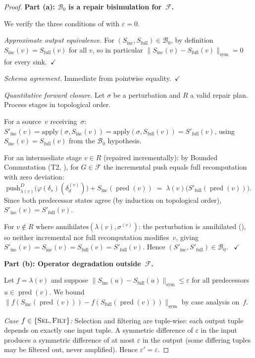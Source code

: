\documentclass[11pt,a4paper]{article}
\theoremstyle{definition}
\newcommand{\push}{\mathrm{push}}
\newcommand{\ann}{\mathrm{annihilates}}
\newcommand{\FragF}{\mathcal{F}}
\DeclareMathOperator{\pred}{pred}
\begin{document}
\begin{proof}
\textbf{Part (a): $\mathcal{B}_0$ is a repair bisimulation for~$\FragF$.}

We verify the three conditions of  with
$\varepsilon = 0$.

\emph{Approximate output equivalence.}
For $(S_{\mathrm{inc}}, S_{\mathrm{full}}) \in \mathcal{B}_0$, by definition
$S_{\mathrm{inc}}(v) = S_{\mathrm{full}}(v)$ for all $v$, so in particular
$\|S_{\mathrm{inc}}(v) - S_{\mathrm{full}}(v)\|_{\mathrm{sym}} = 0$
for every sink.~$\checkmark$

\emph{Schema agreement.}
Immediate from pointwise equality.~$\checkmark$

\emph{Quantitative forward closure.}
Let $\sigma$ be a perturbation and $R$ a valid repair plan.
Process stages in topological order.

For a source~$v$ receiving~$\sigma$:
$S'_{\mathrm{inc}}(v) = \mathrm{apply}(\sigma, S_{\mathrm{inc}}(v))
= \mathrm{apply}(\sigma, S_{\mathrm{full}}(v)) = S'_{\mathrm{full}}(v)$,
using $S_{\mathrm{inc}}(v) = S_{\mathrm{full}}(v)$ from the
$\mathcal{B}_0$ hypothesis.

For an intermediate stage $v \in R$ (repaired incrementally):
by Bounded Commutation (T2, ), for $G \in \FragF$
the incremental push equals full recomputation with zero deviation:
\[
  \push_{\lambda(v)}^D\bigl(\varphi(\delta_s)(\delta_d^{(v)})\bigr)
    + S_{\mathrm{inc}}(\pred(v))
  \;=\;
  \lambda(v)\bigl(S'_{\mathrm{full}}(\pred(v))\bigr).
\]
Since both predecessor states agree (by induction on topological order),
$S'_{\mathrm{inc}}(v) = S'_{\mathrm{full}}(v)$.

For $v \notin R$ where $\ann(\lambda(v), \sigma^{(v)})$: the perturbation is
annihilated (), so neither incremental nor full
recomputation modifies~$v$, giving
$S'_{\mathrm{inc}}(v) = S_{\mathrm{inc}}(v) = S_{\mathrm{full}}(v)
= S'_{\mathrm{full}}(v)$.
Hence $(S'_{\mathrm{inc}}, S'_{\mathrm{full}}) \in \mathcal{B}_0$.
~$\checkmark$

\textbf{Part (b): Operator degradation outside~$\FragF$.}

Let $f = \lambda(v)$ and suppose
$\|S_{\mathrm{inc}}(u) - S_{\mathrm{full}}(u)\|_{\mathrm{sym}}
\leq \varepsilon$ for all predecessors $u \in \pred(v)$.
We bound $\|f(S_{\mathrm{inc}}(\pred(v))) -
f(S_{\mathrm{full}}(\pred(v)))\|_{\mathrm{sym}}$ by case analysis on~$f$.

\emph{Case $f \in \{\textsc{Sel}, \textsc{Filt}\}$:}
Selection and filtering are tuple-wise: each output tuple depends on exactly
one input tuple.  A symmetric difference of $\varepsilon$ in the input
produces a symmetric difference of at most $\varepsilon$ in the output
(some differing tuples may be filtered out, never amplified).
Hence $\varepsilon' = \varepsilon$.


\end{proof}
\end{document}
